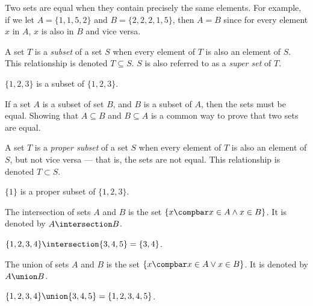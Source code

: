 \documentclass[12pt]{article}
\begin{document}
Two sets are equal when they contain precisely the same elements. For example, if we let $A = \{1, 1, 5, 2\}$ and $B = \{2, 2, 2, 1, 5\}$, then $A = B$ since for every element $x$ in $A$, $x$ is also in $B$ and vice versa.

\begin{defn}\label{subset}
    A set $T$ is a \emph{subset} of a set $S$ when every element of $T$ is also an element of $S$. This relationship is denoted $T \subseteq S$. $S$ is also referred to as a \emph{super set} of $T$.
\end{defn}

\begin{exmp}
    $\{1, 2, 3\}$ is a subset of $\{1, 2, 3\}$.
\end{exmp}

\begin{rmk}
    If a set $A$ is a subset of set $B$, and $B$ is a subset of $A$, then the sets must be equal. Showing that $A \subseteq B$ and $B \subseteq A$ is a common way to prove that two sets are equal.
\end{rmk}

\begin{defn}\label{proper-subset}
    A set $T$ is a \emph{proper subset} of a set $S$ when every element of $T$ is also an element of $S$, but not vice versa --- that is, the sets are not equal. This relationship is denoted $T \subset S$.
\end{defn}

\begin{exmp}
    $\{1\}$ is a proper subset of $\{1, 2, 3\}$.
\end{exmp}

\begin{defn}\label{intersection}
    The intersection of sets $A$ and $B$ is the set $\left\{x \compbar x \in A \land x \in B \right\}$. It is denoted by $A \intersection B$.
\end{defn}

\begin{exmp}
    $\{1, 2, 3, 4\} \intersection \{3, 4, 5\} = \{3, 4\}$.
\end{exmp}

\begin{defn}
    The union of sets $A$ and $B$ is the set $\left\{x \compbar x \in A \lor x \in B\right\}$. It is denoted by $A \union B$.
\end{defn}

\begin{exmp}
    $\{1, 2, 3, 4\} \union \{3, 4, 5\} = \{1, 2, 3, 4, 5\}$.
\end{exmp}
\end{document}
